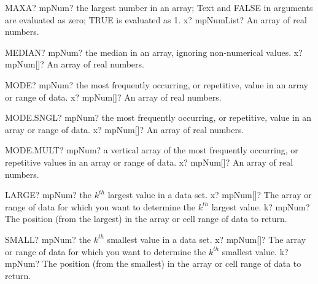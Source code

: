 \documentclass[12pt,a4paper,openany]{book}
\begin{document}
\begin{mpFunctionsExtract}
\mpWorksheetFunctionOneNotImplemented
{MAXA? mpNum? the largest number in an array; Text and FALSE in arguments are evaluated as zero; TRUE is evaluated as 1.}
{x? mpNumList? An array of real numbers.}
\end{mpFunctionsExtract}

\begin{mpFunctionsExtract}
\mpWorksheetFunctionOneNotImplemented
{MEDIAN? mpNum? the median in an array, ignoring non-numerical values.}
{x? mpNum[]? An array of real numbers.}
\end{mpFunctionsExtract}

\begin{mpFunctionsExtract}
\mpWorksheetFunctionOneNotImplemented
{MODE? mpNum? the most frequently occurring, or repetitive, value in an array or range of data.}
{x? mpNum[]? An array of real numbers.}
\end{mpFunctionsExtract}

\begin{mpFunctionsExtract}
\mpWorksheetFunctionOneNotImplemented
{MODE.SNGL? mpNum? the most frequently occurring, or repetitive, value in an array or range of data.}
{x? mpNum[]? An array of real numbers.}
\end{mpFunctionsExtract}

\begin{mpFunctionsExtract}
\mpWorksheetFunctionOneNotImplemented
{MODE.MULT? mpNum? a vertical array of the most frequently occurring, or repetitive values in an array or range of data.}
{x? mpNum[]? An array of real numbers.}
\end{mpFunctionsExtract}

\begin{mpFunctionsExtract}
\mpWorksheetFunctionTwoNotImplemented
{LARGE? mpNum? the $k^{th}$ largest value in a data set.}
{x? mpNum[]?  The array or range of data for which you want to determine the $k^{th}$ largest value.}
{k? mpNum? The position (from the largest) in the array or cell range of data to return.}
\end{mpFunctionsExtract}

\begin{mpFunctionsExtract}
\mpWorksheetFunctionTwoNotImplemented
{SMALL? mpNum? the $k^{th}$ smallest value in a data set.}
{x? mpNum[]?  The array or range of data for which you want to determine the $k^{th}$ smallest value.}
{k? mpNum? The position (from the smallest) in the array or cell range of data to return.}
\end{mpFunctionsExtract}
\end{document}
